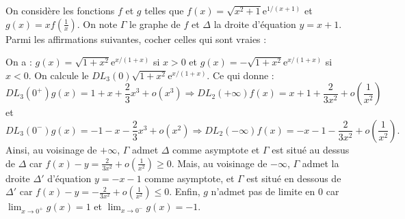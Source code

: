 \begin{question}
On considère les fonctions $f$ et $g$ telles que $\displaystyle f(x)=\sqrt{x^2+1}\mathrm{e}^{1/(x+1)}$ et $\displaystyle g(x)=xf\left(\frac{1}{x}\right)$. On note $\Gamma$ le graphe de $f$ et $\Delta$ la droite d'équation $y=x+1$. Parmi les affirmations suivantes, cocher celles qui sont vraies :
\begin{answers}  
\end{answers}
\vskip2mm
\begin{explanations}
On a : $\displaystyle g(x)=\sqrt{1+x^2}\mathrm{e}^{x/(1+x)}$ si $x>0$ et $\displaystyle g(x)=-\sqrt{1+x^2}\mathrm{e}^{x/(1+x)}$ si $x<0$. On calcule le $DL_3(0)\sqrt{1+x^2}\mathrm{e}^{x/(1+x)}$. Ce qui donne :
$$DL_3(0^+)g(x)=1+x+\frac{2}{3}x^3+o(x^3)\Rightarrow DL_2(+\infty)f(x)=x+1+\frac{2}{3x^2}+o\left(\frac{1}{x^2}\right)$$
et
$$DL_3(0^-)g(x)=-1-x-\frac{2}{3}x^3+o(x^2)\Rightarrow DL_2(-\infty)f(x)=-x-1-\frac{2}{3x^2}+o\left(\frac{1}{x^2}\right).$$
Ainsi, au voisinage de $+\infty$, $\Gamma$ admet $\Delta$ comme asymptote et $\Gamma$ est situé au dessus de $\Delta$ car $\displaystyle f(x)-y=\frac{2}{3x^2}+o\left(\frac{1}{x^2}\right)\geq 0$. Mais, au voisinage de $-\infty$, $\Gamma$ admet la droite $\Delta '$ d'équation $y=-x-1$ comme asymptote, et $\Gamma$ est situé en dessous de $\Delta '$ car $\displaystyle f(x)-y=-\frac{2}{3x^2}+o\left(\frac{1}{x^2}\right)\leq 0$. Enfin, $g$ n'admet pas de limite en $0$ car $\displaystyle \lim _{x\to 0^+}g(x)=1$ et $\displaystyle \lim _{x\to 0^-}g(x)=-1$.
\end{explanations}
\end{question}
